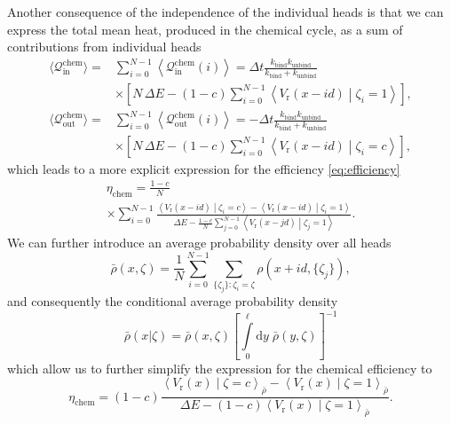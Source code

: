 \documentclass[aps,pre,twocolumn,showpacs,showkeys,superscriptaddress,floatfix]{revtex4-1}
\newcommand{\rmd}{{\mathrm d}}
\begin{document}
Another consequence of the independence of the individual heads 
is that we can express the total mean heat, produced in the chemical cycle, as a sum of contributions from individual heads
\begin{align*}
\langle \mathcal Q_\text{in}^\text{chem} \rangle 
=& \sum\limits_{i=0}^{N-1} \left\langle \mathcal Q_\text{in}^\text{chem}(i) \right\rangle 
= \Delta t \frac{ k_\text{bind} k_\text{unbind} }{ k_\text{bind} + k_\text{unbind} } 
\\ &\times
\left[ N \, \Delta E 
- (1-c) \sum\limits_{i=0}^{N-1} \left\langle V_\text{r}(x - i d ) \middle| \zeta_i = 1 \right\rangle 
\right] ,  
\\
\langle \mathcal Q^\text{chem}_\text{out} \rangle 
=& \sum\limits_{i=0}^{N-1} \left\langle \mathcal Q_\text{out}^\text{chem}(i) \right\rangle 
= - \Delta t \frac{ k_\text{bind} k_\text{unbind} }{ k_\text{bind} + k_\text{unbind} } 
\\ &\times
\left[ N \, \Delta E 
- (1-c) \sum\limits_{i=0}^{N-1} \left\langle V_\text{r}(x - i d ) \middle| \zeta_i = c \right\rangle  
\right] , 
\end{align*}
which leads to a more explicit expression for the efficiency \eqref{eq:efficiency} 
\begin{multline*}
\eta_\text{chem} = \frac{1-c}{N}
\\ \times
\sum\limits_{i=0}^{N-1} \frac{ \left\langle V_\text{r}(x-id) \middle| \zeta_i = c \right\rangle - \left\langle V_\text{r}( x -id ) \middle| \zeta_i = 1 \right\rangle }
{ \Delta E - \frac{1-c}{N} \sum\limits_{j=0}^{N-1} \left\langle V_\text{r}(x-jd) \middle| \zeta_j = 1 \right\rangle } 
. 
\end{multline*}
We can further introduce an average probability density over all heads 
\begin{equation}
\bar{\rho}(x,\zeta) = \frac{1}{N} \sum\limits_{i=0}^{N-1} \sum\limits_{ \{ \zeta_j \} : \zeta_i = \zeta } \rho( x + i d, \{ \zeta_j \} ) ,
\label{eq:eff_distribution}
\end{equation}
and consequently the conditional average probability density
\begin{equation}
\bar{\rho}(x|\zeta) = \bar{\rho}(x,\zeta) \left[ \int\limits_0^\ell \rmd y \; \bar{\rho}(y,\zeta) \right]^{-1}
\label{eq:cond_prob}
\end{equation}
which allow us to further simplify the expression for the chemical efficiency to 
\begin{equation}
\eta_\text{chem} = (1-c)
\frac{ \left\langle V_\text{r}(x) \middle| \zeta = c \right\rangle_{\bar{\rho}} - \left\langle V_\text{r}(x) \middle| \zeta = 1 \right\rangle_{\bar{\rho}} }
{ \Delta E - (1-c) \left\langle V_\text{r}(x) \middle| \zeta = 1 \right\rangle_{\bar{\rho}} } 
. 
\label{eq:eta}
\end{equation}
\end{document}
